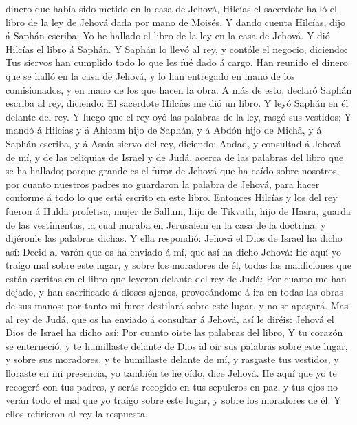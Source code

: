 dinero que había sido metido en la casa de Jehová, Hilcías el sacerdote
halló el libro de la ley de Jehová dada por mano de Moisés.
 Y dando cuenta Hilcías, dijo á Saphán escriba: Yo he
hallado el libro de la ley en la casa de Jehová. Y dió Hilcías el libro
á Saphán.  Y Saphán lo llevó al rey, y contóle el negocio,
diciendo: Tus siervos han cumplido todo lo que les fué dado á cargo.
 Han reunido el dinero que se halló en la casa de Jehová, y
lo han entregado en mano de los comisionados, y en mano de los que hacen
la obra.  A más de esto, declaró Saphán escriba al rey,
diciendo: El sacerdote Hilcías me dió un libro. Y leyó Saphán en él
delante del rey.  Y luego que el rey oyó las palabras de la
ley, rasgó sus vestidos;  Y mandó á Hilcías y á Ahicam hijo
de Saphán, y á Abdón hijo de Michâ, y á Saphán escriba, y á Asaía siervo
del rey, diciendo:  Andad, y consultad á Jehová de mí, y de
las reliquias de Israel y de Judá, acerca de las palabras del libro que
se ha hallado; porque grande es el furor de Jehová que ha caído sobre
nosotros, por cuanto nuestros padres no guardaron la palabra de Jehová,
para hacer conforme á todo lo que está escrito en este libro.
 Entonces Hilcías y los del rey fueron á Hulda profetisa,
mujer de Sallum, hijo de Tikvath, hijo de Hasra, guarda de las
vestimentas, la cual moraba en Jerusalem en la casa de la doctrina; y
dijéronle las palabras dichas.  Y ella respondió: Jehová el
Dios de Israel ha dicho así: Decid al varón que os ha enviado á mí, que
así ha dicho Jehová:  He aquí yo traigo mal sobre este
lugar, y sobre los moradores de él, todas las maldiciones que están
escritas en el libro que leyeron delante del rey de Judá: 
Por cuanto me han dejado, y han sacrificado á dioses ajenos,
provocándome á ira en todas las obras de sus manos; por tanto mi furor
destilará sobre este lugar, y no se apagará.  Mas al rey de
Judá, que os ha enviado á consultar á Jehová, así le diréis: Jehová el
Dios de Israel ha dicho así: Por cuanto oiste las palabras del libro,
 Y tu corazón se enterneció, y te humillaste delante de
Dios al oir sus palabras sobre este lugar, y sobre sus moradores, y te
humillaste delante de mí, y rasgaste tus vestidos, y lloraste en mi
presencia, yo también te he oído, dice Jehová.  He aquí que
yo te recogeré con tus padres, y serás recogido en tus sepulcros en paz,
y tus ojos no verán todo el mal que yo traigo sobre este lugar, y sobre
los moradores de él. Y ellos refirieron al rey la respuesta.
